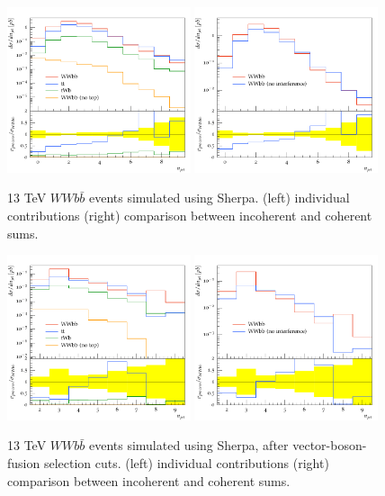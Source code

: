 \documentclass[11pt]{cernrep}
\begin{document}
\begin{figure}
\centering
	\includegraphics[width=0.48\textwidth]{WBF_njets_before_contribs.pdf}
	\includegraphics[width=0.48\textwidth]{WBF_njets_before.pdf}
\caption{\label{fig:wbf_before}
  13 TeV $WWb\bar{b}$ events simulated using Sherpa.
  (left) individual contributions (right) comparison between incoherent and coherent sums.}
\end{figure}

\begin{figure}
\centering
	\includegraphics[width=0.48\textwidth]{WBF_njets_after_contribs.pdf}
	\includegraphics[width=0.48\textwidth]{WBF_njets_after.pdf}
\caption{\label{fig:wbf_after}
  13 TeV $WWb\bar{b}$ events simulated using Sherpa, after vector-boson-fusion selection cuts. 
  (left) individual contributions (right) comparison between incoherent and coherent sums.}
\end{figure}
\end{document}
